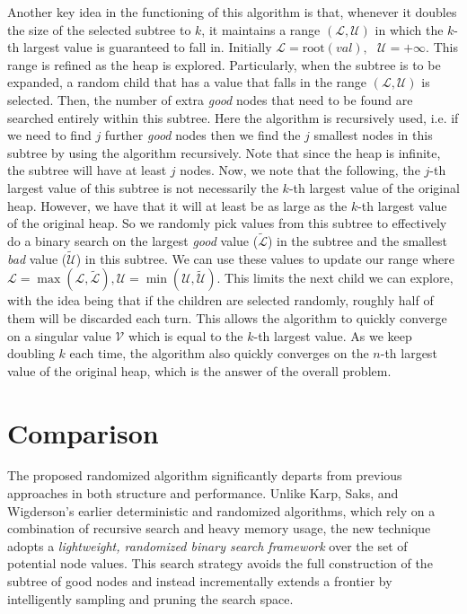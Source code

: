\documentclass{article}
\begin{document}
Another key idea in the functioning of this algorithm is that, whenever it doubles the size of the selected subtree to $k$, it maintains a range $(\mathcal{L}, \mathcal{U})$ in which the $k$-th largest value is guaranteed to fall in. Initially $\mathcal{L} = \text{root}(val), \text{ } \mathcal{U} =+\infty$. This range is refined as the heap is explored. Particularly, when the subtree is to be expanded, a random child that has a value that falls in the range $(\mathcal{L}, \mathcal{U})$ is selected. Then, the number of extra \textit{good} nodes that need to be found are searched entirely within this subtree. Here the algorithm is recursively used, i.e. if we need to find $j$ further \textit{good} nodes then we find the $j$ smallest nodes in this subtree by using the algorithm recursively. Note that since the heap is infinite, the subtree will have at least $j$ nodes. Now, we note that the following, the $j$-th largest value of this subtree is not necessarily the $k$-th largest value of the original heap. However, we have that it will at least be as large as the $k$-th largest value of the original heap. So we randomly pick values from this subtree to effectively do a binary search on the largest \textit{good} value ($\tilde{\mathcal{L}}$) in the subtree and the smallest \textit{bad} value ($\tilde{\mathcal{U}}$) in this subtree. We can use these values to update our range where $\mathcal{L} = \max(\mathcal{L}, \tilde{\mathcal{L}}), \mathcal{U} = \min(\mathcal{U}, \tilde{\mathcal{U}})$. This limits the next child we can explore, with the idea being that if the children are selected randomly, roughly half of them will be discarded each turn. This allows the algorithm to quickly converge on a singular value $\mathcal{V}$ which is equal to the $k$-th largest value. As we keep doubling $k$ each time, the algorithm also quickly converges on the $n$-th largest value of the original heap, which is the answer of the overall problem. 

\section{Comparison}
The proposed randomized algorithm significantly departs from previous approaches in both structure and performance. Unlike Karp, Saks, and Wigderson’s\cite{karp1986search} earlier deterministic and randomized algorithms, which rely on a combination of recursive search and heavy memory usage, the new technique adopts a \textit{lightweight, randomized binary search framework} over the set of potential node values. This search strategy avoids the full construction of the subtree of good nodes and instead incrementally extends a frontier by intelligently sampling and pruning the search space.
\end{document}
